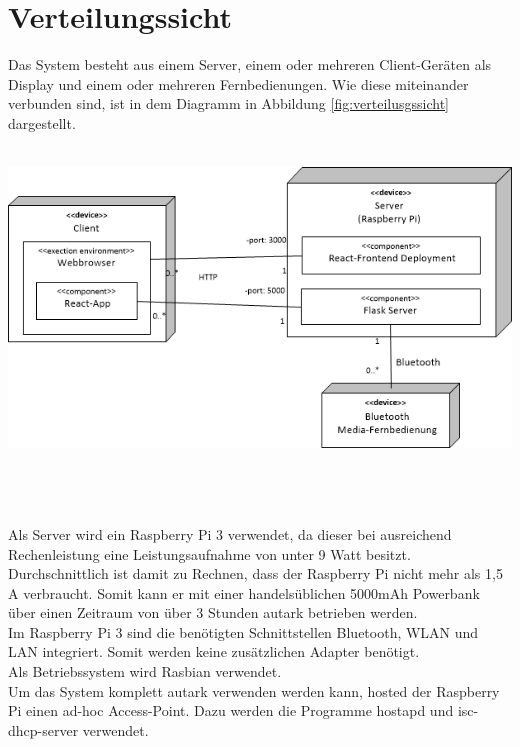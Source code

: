 \chapter{Verteilungssicht}
Das System besteht aus einem Server, einem oder mehreren Client-Geräten als Display und einem oder mehreren Fernbedienungen. Wie diese miteinander verbunden sind, ist in dem Diagramm in Abbildung \ref{fig:verteilusgssicht} dargestellt.\\
\\
\begin{minipage}{\textwidth} 
	\centering
	\includegraphics[width=\textwidth]{Bilder/Verteilungssicht.png}\\
	\label{fig:verteilusgssicht}
\end{minipage}
\\
\\
\\
Als Server wird ein Raspberry Pi 3 verwendet, da dieser bei ausreichend Rechenleistung eine Leistungsaufnahme von unter 9 Watt besitzt. Durchschnittlich ist damit zu Rechnen, dass der Raspberry Pi nicht mehr als 1,5 A verbraucht. Somit kann er mit einer handelsüblichen 5000mAh Powerbank über einen Zeitraum von über 3 Stunden autark betrieben werden. \\
Im Raspberry Pi 3 sind die benötigten Schnittstellen Bluetooth, WLAN und LAN integriert. Somit werden keine zusätzlichen Adapter benötigt.\\
Als Betriebssystem wird Rasbian verwendet.\\
Um das System komplett autark verwenden werden kann, hosted der Raspberry Pi einen ad-hoc Access-Point. Dazu werden die Programme \glqq hostapd\grqq{} und \glqq isc-dhcp-server\grqq{} verwendet. \\
\\
